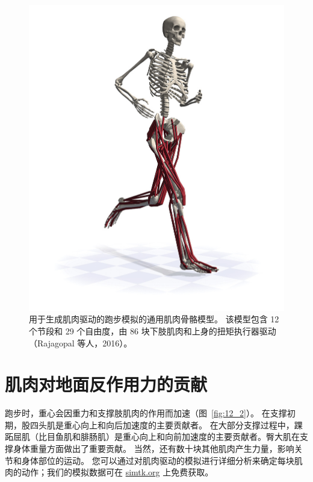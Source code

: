 \begin{figure}[!htb]
	\centering
	\includegraphics[width=1.0\linewidth]{chap12/12_1}
	\caption{用于生成肌肉驱动的跑步模拟的通用肌肉骨骼模型。
		该模型包含 12 个节段和 29 个自由度，由 86 块下肢肌肉和上身的扭矩执行器驱动（Rajagopal 等人，2016）。 \label{fig:12_1}}
\end{figure}


\section{肌肉对地面反作用力的贡献}

跑步时，重心会因重力和支撑肢肌肉的作用而加速（图~\ref{fig:12_2}）。
在支撑初期，股四头肌是重心向上和向后加速度的主要贡献者。
在大部分支撑过程中，踝跖屈肌（比目鱼肌和腓肠肌）是重心向上和向前加速度的主要贡献者。臀大肌在支撑身体重量方面做出了重要贡献。
当然，还有数十块其他肌肉产生力量，影响关节和身体部位的运动。
您可以通过对肌肉驱动的模拟进行详细分析来确定每块肌肉的动作；我们的模拟数据可在 \href{simtk.org}{simtk.org} 上免费获取。


